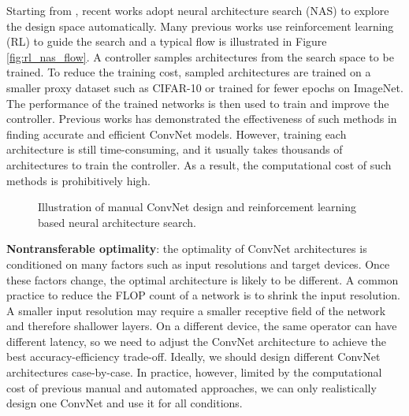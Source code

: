 \documentclass[10pt,twocolumn,letterpaper]{article}
\begin{document}
Starting from \cite{zoph2016neural}, recent works adopt neural architecture search (NAS) to explore the design space automatically. Many previous works \cite{zoph2016neural,zoph2017learning, tan2018mnasnet} use reinforcement learning (RL) to guide the search and a typical flow is illustrated in Figure \ref{fig:rl_nas_flow}. A controller samples architectures from the search space to be trained. To reduce the training cost, sampled architectures are trained on a smaller proxy dataset such as CIFAR-10 or trained for fewer epochs on ImageNet. The performance of the trained networks is then used to train and improve the controller. Previous works \cite{zoph2016neural,zoph2017learning, tan2018mnasnet} has demonstrated the effectiveness of such methods in finding accurate and efficient ConvNet models. However, training each architecture is still time-consuming, and it usually takes thousands of architectures to train the controller. As a result, the computational cost of such methods is prohibitively high.

\begin{figure}[!t]
\begin{center}
\caption{Illustration of manual ConvNet design and reinforcement learning based neural architecture search.}
\label{fig:baseline_design_flow}
\end{center}
\vspace{-14pt}
\end{figure}

\textbf{Nontransferable optimality}: the optimality of ConvNet architectures is conditioned on many factors such as input resolutions and target devices. Once these factors change, the optimal architecture is likely to be different. A common practice to reduce the FLOP count of a network is to shrink the input resolution. A smaller input resolution may require a smaller receptive field of the network and therefore shallower layers. On a different device, the same operator can have different latency, so we need to adjust the ConvNet architecture to achieve the best accuracy-efficiency trade-off. Ideally, we should design different ConvNet architectures case-by-case. In practice, however, limited by the computational cost of previous manual and automated approaches, we can only realistically design one ConvNet and use it for all conditions.
\end{document}

